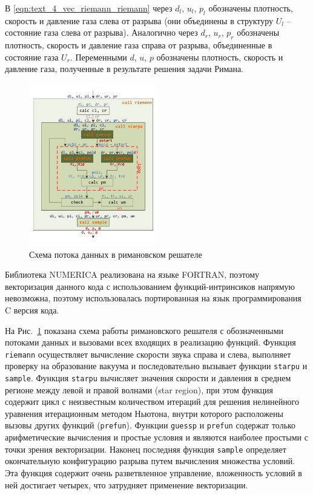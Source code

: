 В \eqref{eqn:text_4_vec_riemann_riemann} через $d_l$, $u_l$, $p_l$ обозначены плотность, скорость и давление газа слева от разрыва (они объединены в структуру  $U_l$ -- состояние газа слева от разрыва).
Аналогично через $d_r$, $u_r$, $p_r$ обозначены плотность, скорость и давление газа справа от разрыва, объединенные в состояние газа $U_r$.
Переменными $d$, $u$, $p$ обозначены плотность, скорость и давление газа, полученные в результате решения задачи Римана.

\begin{figure}[ht]
\centering
\includegraphics[width=0.5\textwidth]{pics/text_4_vec_riemann/pic_functions.pdf}
\singlespacing
{}\caption{Схема потока данных в римановском решателе}
\label{fig:text_4_vec_riem_functions}
\end{figure}

Библиотека NUMERICA реализована на языке FORTRAN, поэтому векторизация данного кода с использованием функций-интринсиков\label{term:intrinsic5} напрямую невозможна, поэтому использовалась портированная на язык программирования C версия кода.

На Рис.~\ref{fig:text_4_vec_riem_functions} показана схема работы римановского решателя с обозначенными потоками данных и вызовами всех входящих в реализацию функций.
Функция \texttt{riemann} осуществляет вычисление скорости звука справа и слева, выполняет проверку на образование вакуума и последовательно вызывает функции \texttt{starpu} и \texttt{sample}.
Функция \texttt{starpu} вычисляет значения скорости и давления в среднем регионе между левой и правой волнами (star region), при этом функция содержит цикл с неизвестным количеством итераций для решения нелинейного уравнения итерационным методом Ньютона, внутри которого расположены вызовы других функций (\texttt{prefun}).
Функции \texttt{guessp} и \texttt{prefun} содержат только арифметические вычисления и простые условия и являются наиболее простыми с точки зрения векторизации.
Наконец последняя функция \texttt{sample} определяет окончательную конфигурацию разрыва путем вычисления множества условий.
Эта функция содержит очень разветвленное управление, вложенность условий в ней достигает четырех, что затрудняет применение векторизации.

